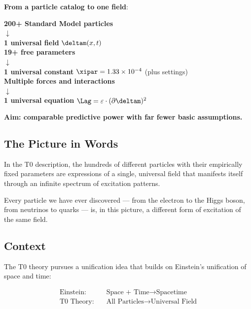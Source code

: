 	\begin{tcolorbox}[colback=green!5!white,colframe=green!75!black,title=The Unification Approach]
		\textbf{From a particle catalog to one field}:
		
		\begin{center}
			\textbf{200+ Standard Model particles} \\
			$\downarrow$ \\
			\textbf{1 universal field} $\deltam(x,t)$ \\[1em]
			
			\textbf{19+ free parameters} \\
			$\downarrow$ \\
			\textbf{1 universal constant} $\xipar = 1.33 \times 10^{-4}$ (plus settings) \\[1em]
			
			\textbf{Multiple forces and interactions} \\
			$\downarrow$ \\
			\textbf{1 universal equation} $\Lag = \varepsilon \cdot (\partial \deltam)^2$
		\end{center}
		
		\textbf{Aim: comparable predictive power with far fewer basic assumptions.}
	\end{tcolorbox}
	
	\subsection{The Picture in Words}
	
	In the T0 description, the hundreds of different particles with their empirically fixed parameters are expressions of a single, universal field that manifests itself through an infinite spectrum of excitation patterns.
	
	Every particle we have ever discovered --- from the electron to the Higgs boson, from neutrinos to quarks --- is, in this picture, a different form of excitation of the same field.
	
	\subsection{Context}
	
	The T0 theory pursues a unification idea that builds on Einstein's unification of space and time:
	
	\begin{align}
		\text{Einstein:} \quad &\text{Space + Time} \rightarrow \text{Spacetime} \\
		\text{T0 Theory:} \quad &\text{All Particles} \rightarrow \text{Universal Field}
	\end{align}
	

